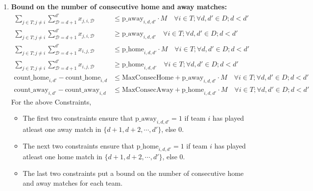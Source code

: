 \documentclass[a4paper, 12pt]{article}
\begin{document}
\begin{enumerate}
    \item \textbf{Bound on the number of consecutive home and away matches:}
    \begin{align*}
        \sum_{j \in T;j \neq i} \sum_{\mathcal{D} = d+1}^{d'} x_{j,i,\mathcal{D}} &\leq \text{p\_away}_{i,d,d'} \cdot M \quad \forall i \in T ; \forall d,d' \in D; d < d'\\
        \sum_{j \in T;j \neq i} \sum_{\mathcal{D} = d+1}^{d'} x_{j,i,\mathcal{D}} &\geq \text{p\_away}_{i,d,d'} \quad \forall i \in T ; \forall d,d' \in D; d < d'\\
        \sum_{j \in T;j \neq i} \sum_{\mathcal{D} = d+1}^{d'} x_{i,j,\mathcal{D}} &\leq \text{p\_home}_{i,d,d'} \cdot M \quad \forall i \in T ; \forall d,d' \in D; d < d'\\
        \sum_{j \in T;j \neq i} \sum_{\mathcal{D} = d+1}^{d'} x_{i,j,\mathcal{D}} &\geq \text{p\_home}_{i,d,d'} \quad \forall i \in T ; \forall d,d' \in D; d < d' \\
        \text{count\_home}_{i,d'} - \text{count\_home}_{i,d} &\leq \text{MaxConsecHome} + \text{p\_away}_{i,d,d'} \cdot M \quad \forall i \in T ; \forall d,d' \in D; d < d' \\
        \text{count\_away}_{i,d'} - \text{count\_away}_{i,d} &\leq \text{MaxConsecAway} + \text{p\_home}_{i,d,d'} \cdot M \quad \forall i \in T ; \forall d,d' \in D; d < d'
    \end{align*}
    For the above Constraints,
    \begin{itemize}
        \item The first two constraints ensure that $\text{p\_away}_{i,d,d'}=1$ if team $i$ has played atleast one away match in $\{d+1,d+2,\cdots, d'\}$, else 0.
        \item The next two constraints ensure that $\text{p\_home}_{i,d,d'}=1$ if team $i$ has played atleast one home match in $\{d+1,d+2,\cdots, d'\}$, else 0.
        \item The last two constraints put a bound on the number of consecutive home and away matches for each team.
    \end{itemize}



\end{enumerate}
\end{document}
